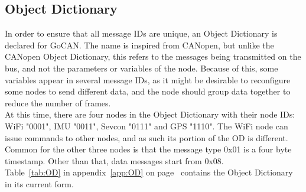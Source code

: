 \subsection{Object Dictionary}\label{sub:OD}
In order to ensure that all message IDs are unique, an Object Dictionary is declared for GoCAN.
The name is inspired from CANopen, but unlike the CANopen Object Dictionary, this refers to the messages being transmitted on the bus, and not the parameters or variables of the node.
Because of this, some variables appear in several message IDs, as it might be desirable to reconfigure some nodes to send different data, and the node should group data together to reduce the number of frames.\\

At this time, there are four nodes in the Object Dictionary with their node IDs: WiFi "0001", IMU "0011", Sevcon "0111" and GPS "1110".
The WiFi node can issue commands to other nodes, and as such its portion of the OD is different. 
Common for the other three nodes is that the message type 0x01 is a four byte timestamp.
Other than that, data messages start from 0x08.\\

Table~\ref{tab:OD} in appendix~\ref{app:OD} on page~\pageref{tab:OD} contains the Object Dictionary in its current form.